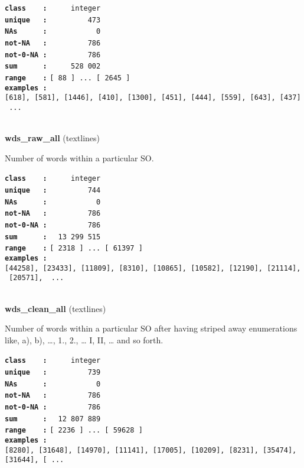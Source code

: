 \documentclass[]{article}
\begin{document}
\textbf{\texttt{class\ \ \ \ :}} \texttt{~~~~~integer}\\
\textbf{\texttt{unique\ \ \ :}} \texttt{~~~~~~~~~473}\\
\textbf{\texttt{NAs\ \ \ \ \ \ :}} \texttt{~~~~~~~~~~~0}\\
\textbf{\texttt{not-NA\ \ \ :}} \texttt{~~~~~~~~~786}\\
\textbf{\texttt{not-0-NA\ :}} \texttt{~~~~~~~~~786}\\
\textbf{\texttt{sum\ \ \ \ \ \ :}} \texttt{~~~~~528~002}\\
\textbf{\texttt{range\ \ \ \ :}}
\texttt{{[}\ 88\ {]}\ ...\ {[}\ 2645\ {]}}\\
\textbf{\texttt{examples\ :}}
\texttt{{[}618{]},\ {[}581{]},\ {[}1446{]},\ {[}410{]},\ {[}1300{]},\ {[}451{]},\ {[}444{]},\ {[}559{]},\ {[}643{]},\ {[}437{]}\ ...}\\

~

\textbf{wds\_raw\_all} (textlines)

Number of words within a particular SO.

\textbf{\texttt{class\ \ \ \ :}} \texttt{~~~~~integer}\\
\textbf{\texttt{unique\ \ \ :}} \texttt{~~~~~~~~~744}\\
\textbf{\texttt{NAs\ \ \ \ \ \ :}} \texttt{~~~~~~~~~~~0}\\
\textbf{\texttt{not-NA\ \ \ :}} \texttt{~~~~~~~~~786}\\
\textbf{\texttt{not-0-NA\ :}} \texttt{~~~~~~~~~786}\\
\textbf{\texttt{sum\ \ \ \ \ \ :}} \texttt{~~13~299~515}\\
\textbf{\texttt{range\ \ \ \ :}}
\texttt{{[}\ 2318\ {]}\ ...\ {[}\ 61397\ {]}}\\
\textbf{\texttt{examples\ :}}
\texttt{{[}44258{]},\ {[}23433{]},\ {[}11809{]},\ {[}8310{]},\ {[}10865{]},\ {[}10582{]},\ {[}12190{]},\ {[}21114{]},\ {[}20571{]},\ \ ...}\\

~

\textbf{wds\_clean\_all} (textlines)

Number of words within a particular SO after having striped away
enumerations like, a), b), \ldots{}, 1., 2., \ldots{} I, II, \ldots{}
and so forth.

\textbf{\texttt{class\ \ \ \ :}} \texttt{~~~~~integer}\\
\textbf{\texttt{unique\ \ \ :}} \texttt{~~~~~~~~~739}\\
\textbf{\texttt{NAs\ \ \ \ \ \ :}} \texttt{~~~~~~~~~~~0}\\
\textbf{\texttt{not-NA\ \ \ :}} \texttt{~~~~~~~~~786}\\
\textbf{\texttt{not-0-NA\ :}} \texttt{~~~~~~~~~786}\\
\textbf{\texttt{sum\ \ \ \ \ \ :}} \texttt{~~12~807~889}\\
\textbf{\texttt{range\ \ \ \ :}}
\texttt{{[}\ 2236\ {]}\ ...\ {[}\ 59628\ {]}}\\
\textbf{\texttt{examples\ :}}
\texttt{{[}8280{]},\ {[}31648{]},\ {[}14970{]},\ {[}11141{]},\ {[}17005{]},\ {[}10209{]},\ {[}8231{]},\ {[}35474{]},\ {[}31644{]},\ {[}\ ...}\\
\end{document}
